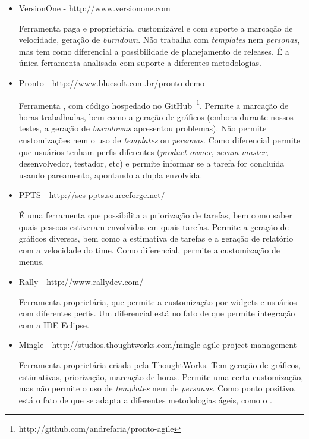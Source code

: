 \begin{itemize}
\item{VersionOne - http://www.versionone.com

Ferramenta paga  e proprietária, customizável e com suporte a marcação de velocidade, geração de \textit{burndown}. Não trabalha
com \textit{templates} nem \textit{personas}, mas tem como diferencial a possibilidade de planejamento de releases. É a única ferramenta analisada com suporte a diferentes metodologias.}

\item{Pronto - http://www.bluesoft.com.br/pronto-demo

Ferramenta \opensource{}, com código hospedado no GitHub~\footnote{http://github.com/andrefaria/pronto-agile}. Permite a marcação de horas trabalhadas, bem como a geração de gráficos (embora durante nossos testes, a geração de \textit{burndowns} apresentou problemas). Não permite customizações nem o uso de \textit{templates} ou \textit{personas}. Como
diferencial permite que usuários tenham perfis diferentes (\textit{product owner}, \textit{scrum master}, desenvolvedor, testador, etc) e
permite informar se a tarefa for concluída usando pareamento, apontando a dupla envolvida.}

\item{PPTS - http://ses-ppts.sourceforge.net/

É uma ferramenta \opensource{} que possibilita a priorização de tarefas, bem como saber quais pessoas estiveram envolvidas
em quais tarefas. Permite a geração de gráficos diversos, bem como a estimativa de tarefas e a geração de relatório com
a velocidade do time. Como diferencial, permite a customização de menus.}

\item{Rally - http://www.rallydev.com/

Ferramenta proprietária, que permite a customização por widgets e usuários com diferentes perfis. Um diferencial está
no fato de que permite integração com a IDE Eclipse.}

\item{Mingle - http://studios.thoughtworks.com/mingle-agile-project-management

Ferramenta proprietária criada pela ThoughtWorks. Tem geração de gráficos, estimativas, priorização, marcação de horas.
Permite uma certa customização, mas não permite o uso de \textit{templates} nem de \textit{personas}. Como ponto positivo, está o fato de
que se adapta a diferentes metodologias ágeis, como o \calopsita{}.}

\end{itemize}

